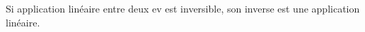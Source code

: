 Si application linéaire entre deux ev est inversible, son inverse est une application linéaire.

\begin{reponses}
\end{reponses}

